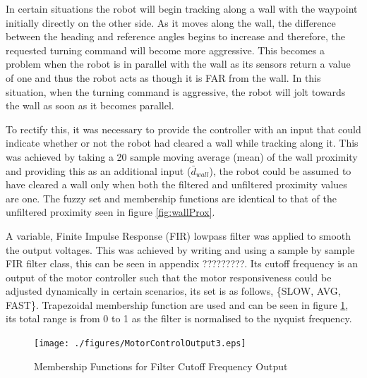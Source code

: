 \documentclass[10pt]{article}
\begin{document}
In certain situations the robot will begin tracking along a wall with the waypoint initially directly on the other side. 
As it moves along the wall, the difference between the heading and reference angles begins to increase and therefore, the requested turning command will become more aggressive. 
This becomes a problem when the robot is in parallel with the wall as its sensors return a value of one and thus the robot acts as though it is FAR from the wall.
In this situation, when the turning command is aggressive, the robot will jolt towards the wall as soon as it becomes parallel. 

\medskip
To rectify this, it was necessary to provide the controller with an input that could indicate whether or not the robot had cleared a wall while tracking along it. 
This was achieved by taking a 20 sample moving average (mean) of the wall proximity and providing this as an additional input ($\bar{d}_{wall}$), the robot could be assumed to have cleared a wall only when both the filtered and unfiltered proximity values are one.
The fuzzy set and membership functions are identical to that of the unfiltered proximity seen in figure \ref{fig:wallProx}.

\medskip
A variable, Finite Impulse Response (FIR) lowpass filter was applied to smooth the output voltages.
This was achieved by writing and using a sample by sample FIR filter class, this can be seen in appendix ?????????.
Its cutoff frequency is an output of the motor controller such that the motor responsiveness could be adjusted dynamically in certain scenarios, its set is as follows, \{SLOW, AVG, FAST\}.
Trapezoidal membership function are used and can be seen in figure \ref{fig:filterOut}, its total range is from 0 to 1 as the filter is normalised to the nyquist frequency. 



\begin{figure}[H]
    \centering
\texttt{[image: ./figures/MotorControlOutput3.eps]}
\caption{Membership Functions for Filter Cutoff Frequency Output}
\label{fig:filterOut}
\end{figure}
\end{document}
